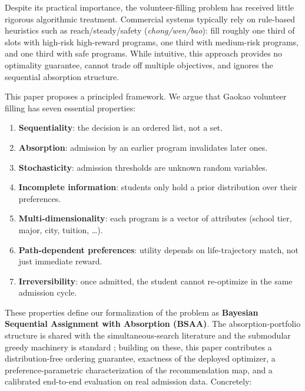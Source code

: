 \documentclass[11pt,a4paper]{article}
\begin{document}
Despite its practical importance, the volunteer-filling problem has received little rigorous algorithmic treatment. Commercial systems typically rely on rule-based heuristics such as reach/steady/safety (\emph{chong/wen/bao}): fill roughly one third of slots with high-risk high-reward programs, one third with medium-risk programs, and one third with safe programs. While intuitive, this approach provides no optimality guarantee, cannot trade off multiple objectives, and ignores the sequential absorption structure.

This paper proposes a principled framework. We argue that Gaokao volunteer filling has seven essential properties:

\begin{enumerate}
  \item \textbf{Sequentiality}: the decision is an ordered list, not a set.
  \item \textbf{Absorption}: admission by an earlier program invalidates later ones.
  \item \textbf{Stochasticity}: admission thresholds are unknown random variables.
  \item \textbf{Incomplete information}: students only hold a prior distribution over their preferences.
  \item \textbf{Multi-dimensionality}: each program is a vector of attributes (school tier, major, city, tuition, \ldots).
  \item \textbf{Path-dependent preferences}: utility depends on life-trajectory match, not just immediate reward.
  \item \textbf{Irreversibility}: once admitted, the student cannot re-optimize in the same admission cycle.
\end{enumerate}

These properties define our formalization of the problem as \textbf{Bayesian Sequential Assignment with Absorption (BSAA)}. The absorption-portfolio structure is shared with the simultaneous-search literature \citep{chade2006simultaneous,kapur2022college} and the submodular greedy machinery is standard \citep{nemhauser1978analysis}; building on these, this paper contributes a distribution-free ordering guarantee, exactness of the deployed optimizer, a preference-parametric characterization of the recommendation map, and a calibrated end-to-end evaluation on real admission data. Concretely:
\end{document}
